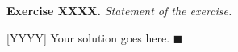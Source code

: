 \documentclass{article}
\newcommand\<{\triangleleft}
\newenvironment{exercise}[1]{\begin{trivlist}\item
                \textbf{Exercise #1.}\it}{\end{trivlist}}
\newenvironment{solution}[1]{\begin{trivlist}\item[]\hspace*{-.5em}[#1]}
                {\hspace*{\fill} $\blacksquare$\end{trivlist}}
\begin{document}
 \begin{exercise}{XXXX}
  Statement of the exercise.
 \end{exercise}

 \begin{solution}{YYYY}
   Your solution goes here.
 \end{solution}
\end{document}
